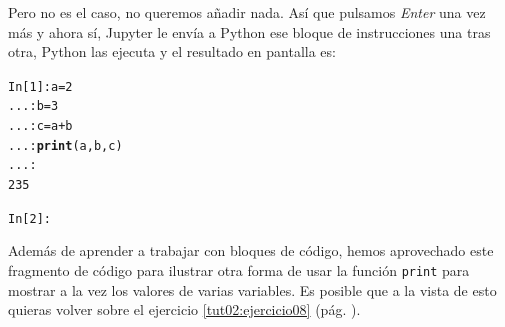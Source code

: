 \documentclass[10pt,a4paper]{article}\usepackage[]{graphicx}\usepackage[]{color}
\makeatletter
\newcommand{\hlkwd}[1]{\textcolor[rgb]{0.737,0.353,0.396}{\textbf{#1}}}%
\newenvironment{kframe}{%
 \def\at@end@of@kframe{}%
 \ifinner\ifhmode%
  \def\at@end@of@kframe{\end{minipage}}%
  \begin{minipage}{\columnwidth}%
 \fi\fi%
 \def\FrameCommand##1{\hskip\@totalleftmargin \hskip-\fboxsep
 \colorbox{shadecolor}{##1}\hskip-\fboxsep
     \hskip-\linewidth \hskip-\@totalleftmargin \hskip\columnwidth}%
 \MakeFramed {\advance\hsize-\width
   \@totalleftmargin\z@ \linewidth\hsize
   \@setminipage}}%
 {\par\unskip\endMakeFramed%
 \at@end@of@kframe}
\newenvironment{knitrout}{}{} %
\makeatother
\begin{document}
Pero no es el caso, no queremos añadir nada. Así que pulsamos {\em Enter} una vez más y ahora sí, Jupyter le envía a Python ese bloque de instrucciones una tras otra, Python las ejecuta y el resultado en pantalla es:
\begin{knitrout}
\color{fgcolor}\begin{kframe}
\begin{alltt}
In [1]: a = 2
   ...: b = 3
   ...: c = a + b
   ...: \hlkwd{print}(a, b, c)
   ...:
2 3 5

In [2]:
\end{alltt}
\end{kframe}
\end{knitrout}
Además de aprender a trabajar con bloques de código, hemos aprovechado este fragmento de código para ilustrar otra forma de usar la función {\tt print} para mostrar a la vez los valores de varias variables. Es posible que a la vista de esto quieras volver sobre el ejercicio \ref{tut02:ejercicio08} (pág. \pageref{tut02:ejercicio08}).

%
\end{document}

